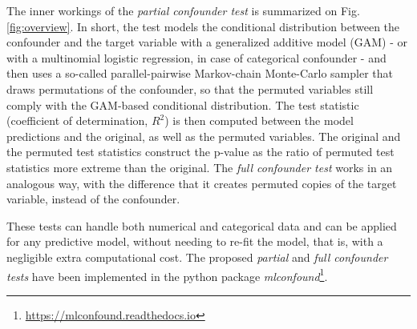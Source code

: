 \documentclass{article}
\begin{document}
The inner workings of the \emph{partial confounder test} is summarized on Fig. \ref{fig:overview}. In short, the test models the conditional distribution between the confounder and the target variable with a generalized additive model (GAM) - or with a multinomial logistic regression, in case of categorical confounder - and then uses a so-called parallel-pairwise Markov-chain Monte-Carlo sampler that draws permutations of the confounder, so that the permuted variables still comply with the GAM-based conditional distribution. The test statistic (coefficient of determination, $R^2$) is then computed between the model predictions and the original, as well as the permuted variables. The original and the permuted test statistics construct the p-value as the ratio of permuted test statistics more extreme than the original. The \emph{full confounder test} works in an analogous way, with the difference that it creates permuted copies of the target variable, instead of the confounder.

These tests can handle both numerical and categorical data and can be applied for any predictive model, without needing to re-fit the model, that is, with a negligible extra computational cost.
The proposed \emph{partial} and \emph{full confounder tests} have been implemented in the python package \emph{mlconfound}\footnote{\href{https://mlconfound.readthedocs.io}{https://mlconfound.readthedocs.io}}. 
\end{document}
